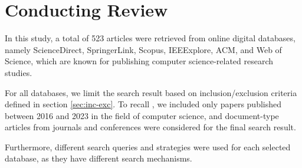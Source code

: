 \section{Conducting Review}

In this study, a total of 523 articles were retrieved from online digital databases, namely ScienceDirect, SpringerLink, Scopus, IEEExplore, ACM, and Web of Science, which are known for publishing computer science-related research studies.

For all databases, we limit the search result based on inclusion/exclusion criteria defined in section \ref{sec:inc-exc}. To recall , we included only papers published between 2016 and 2023 in the field of computer science, and document-type articles from journals and conferences were considered for the final search result.

Furthermore, different search queries and strategies were used for each selected database, as they have different search mechanisms. 










